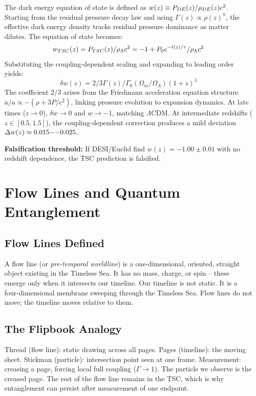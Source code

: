 \documentclass[11pt,a4paper]{article}
\def\frac#1#2{#1/#2} \def\phantom#1{} \def\ensuremath#1{#1}
\let\text\relax \let\mathrm\relax \let\mathbf\relax \let\mathcal\relax
\begin{document}
The dark energy equation of state is defined as $w(z) \equiv P_{\text{DE}}(z) / \rho_{\text{DE}}(z) c^2$. Starting from the residual pressure decay law and using $\Gamma(z) \propto \rho(z)^n$, the effective dark energy density tracks residual pressure dominance as matter dilutes. The equation of state becomes:
\begin{equation}
w_{\text{TSC}}(z) = \frac{P_{\text{TSC}}(z)}{\rho_{\Lambda} c^2} = -1 + \frac{P_0 e^{-t(z)/\tau}}{\rho_{\Lambda} c^2}
\end{equation}
Substituting the coupling-dependent scaling and expanding to leading order yields:
\begin{equation}
\delta w(z) = \frac{2}{3} \frac{\Gamma(z)}{\Gamma_0} \left( \frac{\Omega_m}{\Omega_\Lambda} \right) (1+z)^3
\end{equation}
The coefficient $2/3$ arises from the Friedmann acceleration equation structure $\ddot{a}/a \propto -(\rho + 3P/c^2)$, linking pressure evolution to expansion dynamics. At late times ($z \to 0$), $\delta w \to 0$ and $w \to -1$, matching $\Lambda$CDM. At intermediate redshifts ($z \in [0.5, 1.5]$), the coupling-dependent correction produces a mild deviation $\Delta w(z) \approx 0.015\text{--}0.025$. 

\textbf{Falsification threshold:} If DESI/Euclid find $w(z) = -1.00 \pm 0.01$ with no redshift dependence, the TSC prediction is falsified.

\section{Flow Lines and Quantum Entanglement}
\subsection{Flow Lines Defined}
A flow line (or \textit{pre-temporal worldline}) is a one-dimensional, oriented, straight object existing in the Timeless Sea. It has no mass, charge, or spin -- these emerge only when it intersects our timeline. Our timeline is not static. It is a four-dimensional membrane sweeping through the Timeless Sea. Flow lines do not move; the timeline moves relative to them.

\subsection{The Flipbook Analogy}
Thread (flow line): static drawing across all pages. Pages (timeline): the moving sheet. Stickman (particle): intersection point seen at one frame. Measurement: creasing a page, forcing local full coupling ($\Gamma \to 1$). The particle we observe is the creased page. The rest of the flow line remains in the TSC, which is why entanglement can persist after measurement of one endpoint.
\end{document}
